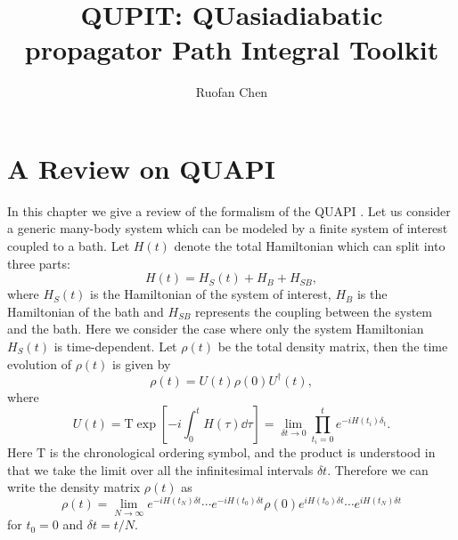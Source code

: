 \documentclass[11pt]{book}
\date{}
\title{}
\begin{document}
\title{QUPIT: QUasiadiabatic propagator Path Integral Toolkit}
\author{Ruofan Chen}
\maketitle
\tableofcontents

\chapter{A Review on QUAPI}
\label{sec:org659ab9b}
In this chapter we give a review of the formalism of the QUAPI
\cite{makarov1994-path,makri1995-numerical,segal2010-numerically}.  Let
us consider a generic many-body system which can be modeled by a
finite system of interest coupled to a bath. Let \(H(t)\) denote the
total Hamiltonian which can split into three parts:
\begin{equation}
H(t)=H_S(t)+H_B+H_{SB},
\end{equation}
where \(H_S(t)\) is the Hamiltonian of the system of interest, \(H_B\) is
the Hamiltonian of the bath and \(H_{SB}\) represents the coupling
between the system and the bath. Here we consider the case where only
the system Hamiltonian \(H_S(t)\) is time-dependent. Let \(\rho(t)\) be
the total density matrix, then the time evolution of \(\rho(t)\) is
given by
\begin{equation}
\rho(t)=U(t)\rho(0)U^{\dag}(t),
\end{equation}
where
\begin{equation}
U(t)=\mathrm{T}\exp[-i\int_0^t H(\tau)\dd{\tau}]
=\lim_{\delta t\to0}\prod_{t_i=0}^t e^{-iH(t_i)\delta_t}.
\end{equation}
Here \(\mathrm{T}\) is the chronological ordering symbol, and the
product is understood in that we take the limit over all the
infinitesimal intervals \(\delta t\). Therefore we can write the density
matrix \(\rho(t)\) as
\begin{equation}
\rho(t)=\lim_{N\to\infty}e^{-iH(t_N)\delta t}\cdots e^{-iH(t_0)\delta t}
\rho(0)e^{iH(t_0)\delta t}\cdots e^{iH(t_N)\delta t}
\end{equation}
for \(t_0=0\) and \(\delta t=t/N\).
\end{document}
